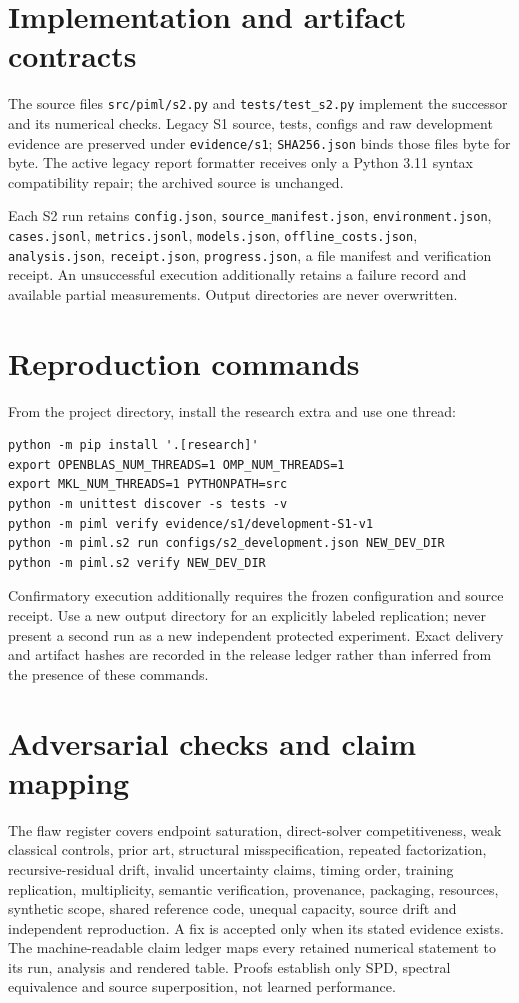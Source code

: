 \section{Implementation and artifact contracts}
The source files \texttt{src/piml/s2.py} and \texttt{tests/test\_s2.py} implement the successor and its numerical checks. Legacy S1 source, tests, configs and raw development evidence are preserved under \texttt{evidence/s1}; \texttt{SHA256.json} binds those files byte for byte. The active legacy report formatter receives only a Python 3.11 syntax compatibility repair; the archived source is unchanged.

Each S2 run retains \texttt{config.json}, \texttt{source\_manifest.json}, \texttt{environment.json}, \texttt{cases.jsonl}, \texttt{metrics.jsonl}, \texttt{models.json}, \texttt{offline\_costs.json}, \texttt{analysis.json}, \texttt{receipt.json}, \texttt{progress.json}, a file manifest and verification receipt. An unsuccessful execution additionally retains a failure record and available partial measurements. Output directories are never overwritten.

\section{Reproduction commands}
From the project directory, install the research extra and use one thread:
\begin{verbatim}
python -m pip install '.[research]'
export OPENBLAS_NUM_THREADS=1 OMP_NUM_THREADS=1
export MKL_NUM_THREADS=1 PYTHONPATH=src
python -m unittest discover -s tests -v
python -m piml verify evidence/s1/development-S1-v1
python -m piml.s2 run configs/s2_development.json NEW_DEV_DIR
python -m piml.s2 verify NEW_DEV_DIR
\end{verbatim}
Confirmatory execution additionally requires the frozen configuration and source receipt. Use a new output directory for an explicitly labeled replication; never present a second run as a new independent protected experiment. Exact delivery and artifact hashes are recorded in the release ledger rather than inferred from the presence of these commands.

\section{Adversarial checks and claim mapping}
The flaw register covers endpoint saturation, direct-solver competitiveness, weak classical controls, prior art, structural misspecification, repeated factorization, recursive-residual drift, invalid uncertainty claims, timing order, training replication, multiplicity, semantic verification, provenance, packaging, resources, synthetic scope, shared reference code, unequal capacity, source drift and independent reproduction. A fix is accepted only when its stated evidence exists. The machine-readable claim ledger maps every retained numerical statement to its run, analysis and rendered table. Proofs establish only SPD, spectral equivalence and source superposition, not learned performance.
